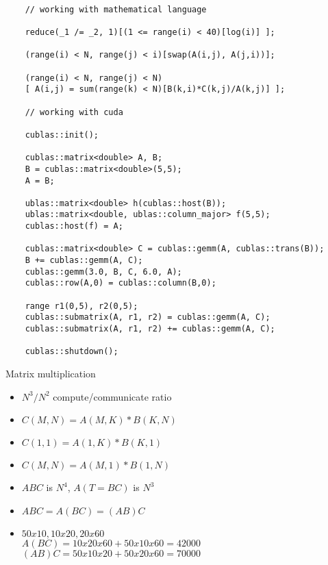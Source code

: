 \documentclass{beamer}
\begin{document}
\tiny {
  \lstset{numbers=left,language=C++}
  \begin{lstlisting}[label=some-code,caption=C++ DSL]

    // working with mathematical language

    reduce(_1 /= _2, 1)[(1 <= range(i) < 40)[log(i)] ];

    (range(i) < N, range(j) < i)[swap(A(i,j), A(j,i))];

    (range(i) < N, range(j) < N)
    [ A(i,j) = sum(range(k) < N)[B(k,i)*C(k,j)/A(k,j)] ];

    // working with cuda

    cublas::init();

    cublas::matrix<double> A, B;
    B = cublas::matrix<double>(5,5);
    A = B;

    ublas::matrix<double> h(cublas::host(B));
    ublas::matrix<double, ublas::column_major> f(5,5);
    cublas::host(f) = A;

    cublas::matrix<double> C = cublas::gemm(A, cublas::trans(B));
    B += cublas::gemm(A, C);
    cublas::gemm(3.0, B, C, 6.0, A);
    cublas::row(A,0) = cublas::column(B,0);

    range r1(0,5), r2(0,5);
    cublas::submatrix(A, r1, r2) = cublas::gemm(A, C);
    cublas::submatrix(A, r1, r2) += cublas::gemm(A, C);

    cublas::shutdown();

  \end{lstlisting}
}

\normalsize

\begin{frame}{Matrix multiplication}
  \begin{itemize}
  \item $N ^3/N ^2 $ compute/communicate ratio 
  \item $C(M,N) = A(M,K)*B(K,N)$
  \item $C(1,1) = A(1,K)*B(K,1)$
  \item $C(M,N) = A(M,1)*B(1,N)$
  \item $ABC$ is $N^4$, $A(T = BC)$ is $N^3$
  \item $ABC = A(BC) = (AB)C$
  \item $50x10, 10x20, 20x60$ \\
    $A(BC) = 10x20x60 + 50x10x60 = 42000$ \\
    $(AB)C = 50x10x20 + 50x20x60 = 70000$
  \end{itemize}
\end{frame}
\end{document}
